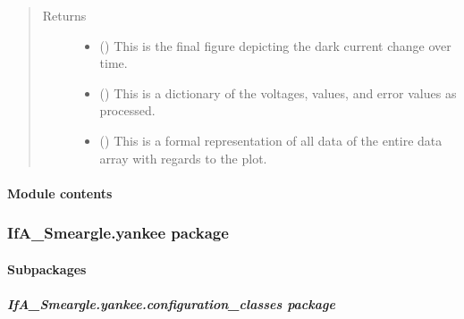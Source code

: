 \documentclass[letterpaper,10pt,english]{sphinxmanual}
\begin{document}
\begin{fulllineitems}
\begin{quote}
\begin{description}
\item[{Returns}] \leavevmode
\begin{itemize}
\item {} 
 () \textendash{} This is the final figure depicting the dark current change over time.

\item {} 
 () \textendash{} This is a dictionary of the voltages, values, and error values as
processed.

\item {} 
 () \textendash{} This is a formal representation of all data of the entire data array
with regards to the plot.

\end{itemize}


\end{description}\end{quote}

\end{fulllineitems}



\paragraph{Module contents}
\label{\detokenize{python_docstrings/IfA_Smeargle.oscar:module-IfA_Smeargle.oscar}}\label{\detokenize{python_docstrings/IfA_Smeargle.oscar:module-contents}}

\subsubsection{IfA\_Smeargle.yankee package}
\label{\detokenize{python_docstrings/IfA_Smeargle.yankee:ifa-smeargle-yankee-package}}\label{\detokenize{python_docstrings/IfA_Smeargle.yankee::doc}}

\paragraph{Subpackages}
\label{\detokenize{python_docstrings/IfA_Smeargle.yankee:subpackages}}

\subparagraph{IfA\_Smeargle.yankee.configuration\_classes package}
\label{\detokenize{python_docstrings/IfA_Smeargle.yankee.configuration_classes:ifa-smeargle-yankee-configuration-classes-package}}\label{\detokenize{python_docstrings/IfA_Smeargle.yankee.configuration_classes::doc}}
\end{document}
